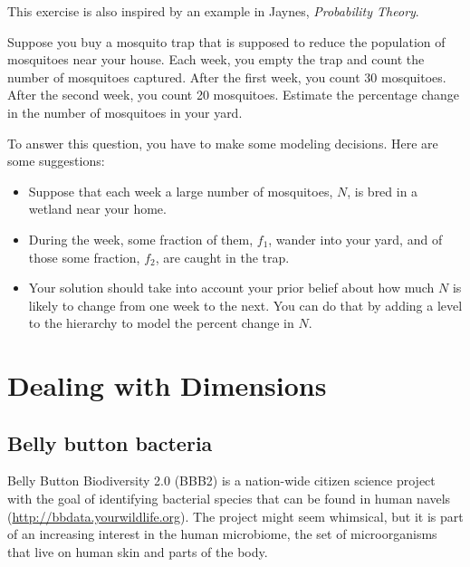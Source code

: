 \documentclass[12pt]{book}
\begin{document}
\begin{exercise}
This exercise is also inspired by an example in Jaynes, {\em
Probability Theory}.

Suppose you buy a mosquito trap that is supposed to reduce the
population of mosquitoes near your house.  Each
week, you empty the trap and count the number of mosquitoes
captured.  After the first week, you count 30 mosquitoes.
After the second week, you count 20 mosquitoes.  Estimate the
percentage change in the number of mosquitoes in your yard.

To answer this question, you have to make some modeling
decisions.  Here are some suggestions:

\begin{itemize}

\item Suppose that each week a large number of mosquitoes, $N$, is bred
in a wetland near your home.

\item During the week, some fraction of
them, $f_1$, wander into your yard, and of those some fraction, $f_2$,
are caught in the trap.

\item Your solution should take into account your prior belief
about how much $N$ is likely to change from one week to the next.
You can do that by adding a level to the hierarchy to
model the percent change in $N$.

\end{itemize}

\end{exercise}


\chapter{Dealing with Dimensions}
\label{species}

\section{Belly button bacteria}

Belly Button Biodiversity 2.0 (BBB2) is a nation-wide citizen
science project with the goal of identifying bacterial species that
can be found in human navels (\url{http://bbdata.yourwildlife.org}).
The project might seem whimsical, but it is part of an increasing
interest in the human microbiome, the set of microorganisms that live
on human skin and parts of the body.
\end{document}
